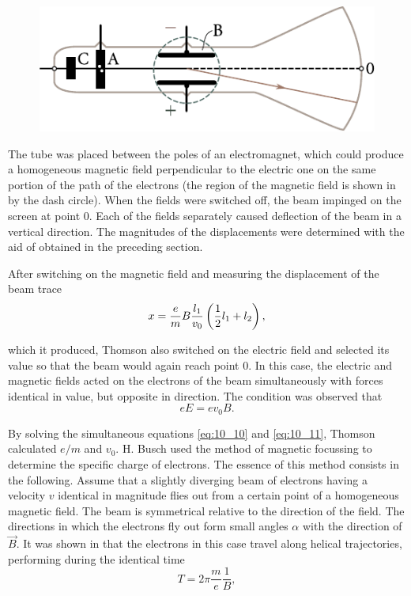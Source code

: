 \begin{figure}[t]
	\begin{center}
		\includegraphics[scale=1]{figures/ch_10/fig_10_6.pdf}
		\caption[]{}
		\label{fig:10_6}
	\end{center}
	\vspace{-0.8cm}
\end{figure}

The tube was placed between the poles of an electromagnet, which could produce a homogeneous magnetic field perpendicular to the electric one on the same portion of the path of the electrons (the region of the magnetic field is shown in  by the dash circle).
When the fields were switched off, the beam impinged on the screen at point $0$.
Each of the fields separately caused deflection of the beam in a vertical direction.
The magnitudes of the displacements were determined with the aid of  obtained in the
preceding section.

After switching on the magnetic field and measuring the displacement of the beam trace
\begin{equation}\label{eq:10_10}
    x = \frac{e}{m} B \frac{l_1}{v_0} \left(\frac{1}{2} l_1 + l_2\right),
\end{equation}

\noindent
which it produced, Thomson also switched on the electric field and selected its value so that the beam would again reach point $0$.
In this case, the electric and magnetic fields acted on the electrons of the beam simultaneously with forces identical in value, but opposite in direction.
The condition was observed that
\begin{equation}\label{eq:10_11}
    eE = ev_0 B.
\end{equation}

\noindent
By solving the simultaneous equations \eqref{eq:10_10} and \eqref{eq:10_11}, Thomson
calculated $e/m$ and $v_0$.
H. Busch used the method of magnetic focussing to determine the specific charge of electrons.
The essence of this method consists in the following.
Assume that a slightly diverging beam of electrons having a velocity $v$ identical in magnitude flies out from a certain point of a homogeneous magnetic field.
The beam is symmetrical relative to the direction of the field.
The directions in which the electrons fly out form small angles $\alpha$ with the direction of $\vec{B}$.
It was shown in  that the electrons in this case travel along helical trajectories, performing during the identical time
\begin{equation*}
    T = 2\pi \frac{m}{e} \frac{1}{B},
\end{equation*}

